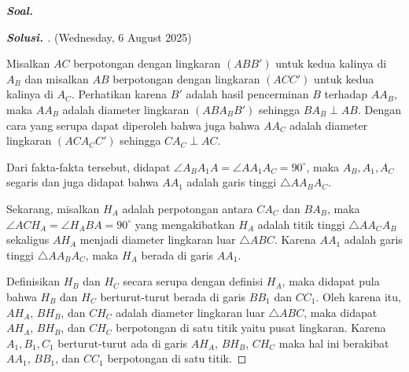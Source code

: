 \textbf{\textit{Soal.}} 

\begin{proof}[\textbf{Solusi. }] (Wednesday, 6 August 2025)
    
    Misalkan $AC$ berpotongan dengan lingkaran $(ABB')$ untuk kedua kalinya di $A_B$ dan misalkan $AB$ berpotongan dengan lingkaran $(ACC')$ untuk kedua kalinya di $A_C$. Perhatikan karena $B'$ adalah hasil pencerminan $B$ terhadap $AA_B$, maka $AA_B$ adalah diameter lingkaran $(ABA_BB')$ sehingga  $BA_B \perp AB$. Dengan cara yang serupa dapat diperoleh bahwa juga bahwa $AA_C$ adalah diameter lingkaran $(ACA_CC')$ sehingga $CA_C \perp AC$.
    
    Dari fakta-fakta tersebut, didapat $\angle A_BA_1A = \angle AA_1A_C = 90^\circ$, maka $A_B, A_1, A_C$ segaris dan juga didapat bahwa $AA_1$ adalah garis tinggi $\triangle AA_BA_C$.
    
    Sekarang, misalkan $H_A$ adalah perpotongan antara $CA_C$ dan $BA_B$, maka $\angle ACH_A = \angle H_ABA = 90^\circ$ yang mengakibatkan $H_A$ adalah titik tinggi $\triangle AA_CA_B$ sekaligus $AH_A$ menjadi diameter lingkaran luar $\triangle ABC$. Karena $AA_1$ adalah garis tinggi $\triangle AA_BA_C$, maka $H_A$ berada di garis $AA_1$.
    
    Definisikan $H_B$ dan $H_C$ secara serupa dengan definisi $H_A$, maka didapat pula bahwa $H_B$ dan $H_C$ berturut-turut berada di garis $BB_1$ dan $CC_1$. Oleh karena itu, $AH_A$, $BH_B$, dan $CH_C$ adalah diameter lingkaran luar $\triangle ABC$, maka didapat $AH_A$, $BH_B$, dan $CH_C$ berpotongan di satu titik yaitu pusat lingkaran. Karena $A_1,B_1,C_1$ berturut-turut ada di garis $AH_A$, $BH_B$, $CH_C$ maka hal ini berakibat $AA_1$, $BB_1$, dan $CC_1$ berpotongan di satu titik.
\end{proof}